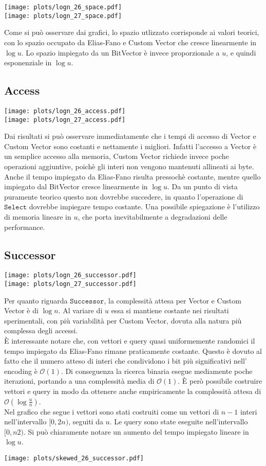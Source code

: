 \documentclass{article}
\newcommand{\ttt}{\texttt}
\newcommand*{\OO}{\ensuremath{\mathcal{O}}}
\begin{document}
\texttt{[image: plots/logn\_26\_space.pdf]}
\\
\texttt{[image: plots/logn\_27\_space.pdf]}

Come si pu\`o osservare dai grafici, lo spazio utlizzato corrisponde ai valori teorici,
con lo spazio occupato da Elias-Fano e Custom Vector che cresce linearmente in $\log u$.
Lo spazio impiegato da un BitVector \`e invece proporzionale a $u$, e quindi esponenziale in $\log u$.

\pagebreak
\subsection{Access}
\texttt{[image: plots/logn\_26\_access.pdf]}
\\
\texttt{[image: plots/logn\_27\_access.pdf]}

Dai risultati si pu\`o osservare immediatamente che i tempi di accesso di Vector e Custom Vector sono costanti e nettamente i migliori. Infatti l'accesso a Vector \`e un semplice accesso alla memoria, Custom Vector richiede invece poche operazioni aggiuntive, poich\`e gli interi non vengono mantenuti allineati ai byte.\\
Anche il tempo impiegato da Elias-Fano risulta pressoch\`e costante, mentre quello impiegato dal BitVector cresce linearmente in $\log u$. Da un punto di vista puramente teorico questo non dovrebbe succedere, in quanto l'operazione di $\ttt{Select}$ dovrebbe impiegare tempo costante. Una possibile spiegazione \`e l'utilizzo di memoria lineare in $u$, che porta inevitabilmente a degradazioni delle performance.

\pagebreak
\subsection{Successor}
\texttt{[image: plots/logn\_26\_successor.pdf]}
\\
\texttt{[image: plots/logn\_27\_successor.pdf]}

Per quanto riguarda $\ttt{Successor}$, la complessit\`a attesa per Vector e Custom Vector \`e di $\log n$. Al variare di $u$ essa si mantiene costante nei risultati sperimentali, con pi\`u variabilit\`a per Custom Vector, dovuta alla natura pi\`u complessa degli accessi.\\
\`E interessante notare che, con vettori e query quasi uniformemente randomici il tempo impiegato da Elias-Fano rimane praticamente costante. Questo \`e dovuto al fatto che il numero atteso di interi che condividono i bit pi\`u significativi nell' encoding \`e $\OO (1)$. Di conseguenza la ricerca binaria esegue mediamente poche iterazioni, portando a una complessit\`a media di $\OO(1)$. \`E per\`o possibile costruire vettori e query in modo da ottenere anche empiricamente la complessit\`a attesa di $\OO(\log \frac{u}{n})$.\\
Nel grafico che segue i vettori sono stati costruiti come un vettori di $n-1$ interi nell'intervallo $[0, 2n)$, seguiti da $u$. Le query sono state eseguite nell'intervallo $[0, n2)$. Si pu\`o chiaramente notare un aumento del tempo impiegato lineare in $\log u$.

\texttt{[image: plots/skewed\_26\_successor.pdf]}
\end{document}
